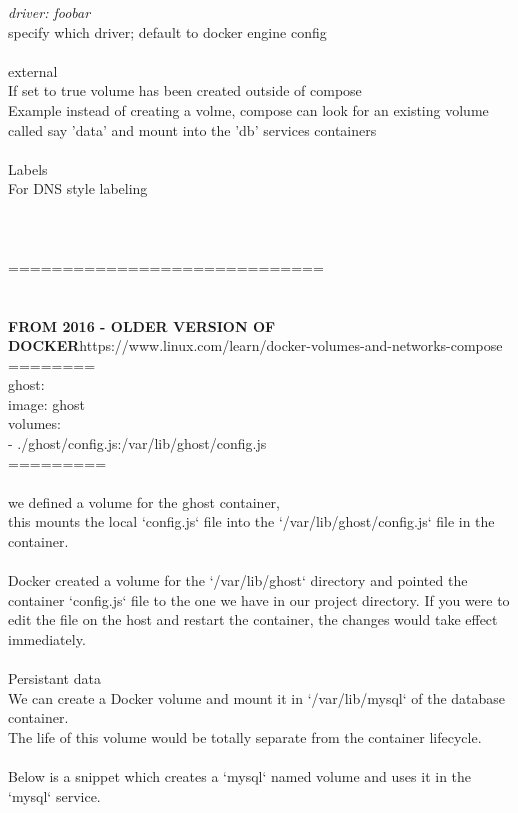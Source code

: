 \documentclass[10pt,a4paper]{article}
\begin{document}
{{{{{{{{{{{{{{\textit{driver: foobar}}{\large    \\
specify which driver; default to docker engine config\\
	\\
external\\
If set to true volume has been created outside of compose\\
Example instead of creating a volme, compose can look for an existing volume called say 'data' and mount into the 'db' services containers\\
\\
Labels\\
For DNS style labeling\\
\\
\\
\\
=============================\\
\\
\\
\textbf{FROM 2016 - OLDER VERSION OF DOCKER}}{\large }https://www.linux.com/learn/docker-volumes-and-networks-compose{\large \\
========\\
ghost:  \\
  image: ghost\\
  volumes:\\
    - ./ghost/config.js:/var/lib/ghost/config.js\\
=========\\
\\
we defined a volume for the ghost container, \\
this mounts the local `config.js` file into the `/var/lib/ghost/config.js` file in the container. \\
\\
Docker created a volume for the `/var/lib/ghost` directory and pointed the container `config.js` file to the one we have in our project directory. If you were to edit the file on the host and restart the container, the changes would take effect immediately.\\
\\
Persistant data\\
We can create a Docker volume and mount it in `/var/lib/mysql` of the database container. \\
The life of this volume would be totally separate from the container lifecycle.\\
\\
Below is a snippet which creates a `mysql` named volume and uses it in the `mysql` service.\\
}}}}}}}}}}}}}}
\end{document}
